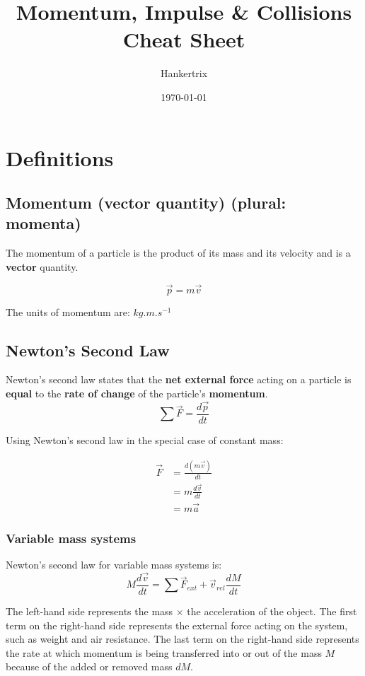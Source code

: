 \documentclass[11pt]{article}
\author{Hankertrix}
\date{\today}
\title{Momentum, Impulse \& Collisions Cheat Sheet}
\begin{document}
\maketitle
\setcounter{tocdepth}{2}
\tableofcontents \clearpage\newpage

\section{Definitions}
\label{sec:org893204f}

\subsection{Momentum (vector quantity) (plural: momenta)}
\label{sec:orgd3047a9}
The momentum of a particle is the product of its mass and its velocity and is a \textbf{vector} quantity.

\[\vec{p} = m \vec{v}\]

The units of momentum are: \(\unit{kg.m.s^{-1}}\)

\subsection{Newton's Second Law}
\label{sec:orgcc039e0}
Newton's second law states that the \textbf{net external force} acting on a particle is \textbf{equal} to the \textbf{rate of change} of the particle's \textbf{momentum}.
\[\sum \vec{F} = \frac{d \vec{p}}{dt}\]

Using Newton's second law in the special case of constant mass:

\begin{align*}
\vec{F} &= \frac{d(m \vec{v})}{dt} \\
&= m \frac{d \vec{v}}{dt} \\
&= m \vec{a}
\end{align*}

\subsubsection{Variable mass systems}
\label{sec:org6f0a987}
Newton's second law for variable mass systems is:
\[M \frac{d \vec{v}}{dt} = \sum \vec{F}_{ext} + \vec{v}_{rel} \frac{dM}{dt}\]

The left-hand side represents the mass \(\times\) the acceleration of the object. The first term on the right-hand side represents the external force acting on the system, such as weight and air resistance. The last term on the right-hand side represents the rate at which momentum is being transferred into or out of the mass \(M\) because of the added or removed mass \(dM\).
\end{document}

